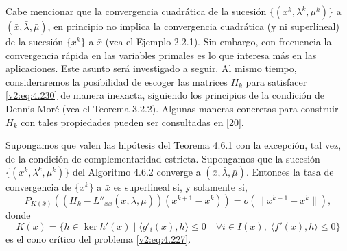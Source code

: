 Cabe mencionar que la convergencia cuadrática de la sucesión $\{(x^k, \lambda^k, \mu^k)\}$ a $(\bar{x}, \bar{\lambda}, \bar{\mu})$, en principio no implica la convergencia cuadrática (y ni superlineal) de la sucesión $\{x^k\}$ a $\bar{x}$ (vea el Ejemplo 2.2.1). Sin embargo, con frecuencia la convergencia rápida en las variables primales es lo que interesa más en las aplicaciones. Este asunto será investigado a seguir. Al mismo tiempo, consideraremos la posibilidad de escoger las matrices $H_k$ para satisfacer \eqref{v2:eq:4.230} de manera inexacta, siguiendo los principios de la condición de Dennis-Moré (vea el Teorema 3.2.2). Algunas maneras concretas para construir $H_k$ con tales propiedades pueden ser consultadas en [20].

\begin{theorem}\label{v2:thm:4.6.2}
    Supongamos que valen las hipótesis del Teorema 4.6.1 con la excepción, tal vez, de la condición de complementaridad estricta. Supongamos que la sucesión $\{(x^k, \lambda^k, \mu^k)\}$ del Algoritmo 4.6.2 converge a $(\bar{x}, \bar{\lambda}, \bar{\mu})$.
    Entonces la tasa de convergencia de $\{x^k\}$ a $\bar{x}$ es superlineal si, y solamente si,
    \begin{equation}
        P_{K(\bar{x})} \left( (H_k - L''_{xx}(\bar{x}, \bar{\lambda}, \bar{\mu})) (x^{k+1} - x^k) \right) = o(\|x^{k+1} - x^k\|),
        \label{v2:eq:4.247}
    \end{equation}
    donde
    \[
        K(\bar{x}) = \{h \in \ker h'(\bar{x}) \mid \langle g'_i(\bar{x}), h \rangle \le 0 \quad \forall i \in I(\bar{x}), \; \langle f'(\bar{x}), h \rangle \le 0\}
    \]
    es el cono crítico del problema \eqref{v2:eq:4.227}.
\end{theorem}
